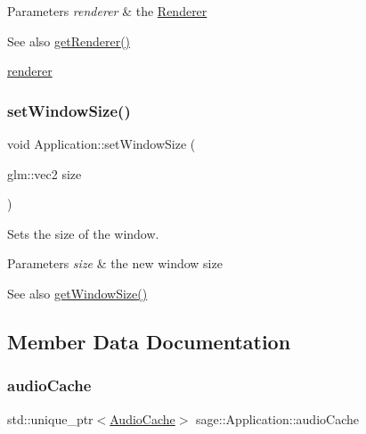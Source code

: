 \begin{DoxyParams}{Parameters}
{\em renderer} & the \mbox{\hyperlink{classsage_1_1Renderer}{Renderer}} \\
\hline
\end{DoxyParams}
\begin{DoxySeeAlso}{See also}
\mbox{\hyperlink{classsage_1_1Application_a023b31b837007c82c91dab8be17d149c}{get\+Renderer()}} 

\mbox{\hyperlink{classsage_1_1Application_ac0297e6d65ef3662c807f4026f63c8ba}{renderer}} 
\end{DoxySeeAlso}
\mbox{\label{classsage_1_1Application_a991df90e69398b7fe8eeb0fa2df3d92e}} 
\subsubsection{\texorpdfstring{setWindowSize()}{setWindowSize()}}
{\footnotesize\ttfamily void Application\+::set\+Window\+Size (\begin{DoxyParamCaption}\item[{glm\+::vec2}]{size }\end{DoxyParamCaption})}



Sets the size of the window. 


\begin{DoxyParams}{Parameters}
{\em size} & the new window size \\
\hline
\end{DoxyParams}
\begin{DoxySeeAlso}{See also}
\mbox{\hyperlink{classsage_1_1Application_ac0fa1750ee8dcacc37cc9eaed72f12f9}{get\+Window\+Size()}} 
\end{DoxySeeAlso}


\subsection{Member Data Documentation}
\mbox{\label{classsage_1_1Application_a84a266e1a477f1c82d36e4cb5c2feab8}} 
\subsubsection{\texorpdfstring{audioCache}{audioCache}}
{\footnotesize\ttfamily std\+::unique\+\_\+ptr$<$\mbox{\hyperlink{classsage_1_1AudioCache}{Audio\+Cache}}$>$ sage\+::\+Application\+::audio\+Cache\hspace{0.3cm}{\ttfamily [private]}}

